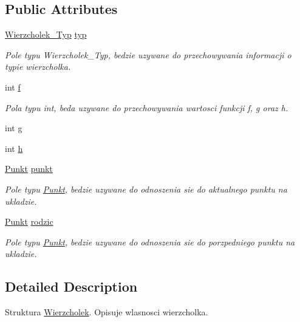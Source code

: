 \subsection*{Public Attributes}
\begin{DoxyCompactItemize}
\item 
\hyperlink{graf_8hh_af54d448689b4613c3715929ca2a914a2}{Wierzcholek\-\_\-\-Typ} \hyperlink{struct_wierzcholek_ac812fe482bda5f924cf38d48340aa018}{typ}
\begin{DoxyCompactList}\small\item\em Pole typu Wierzcholek\-\_\-\-Typ, bedzie uzywane do przechowywania informacji o typie wierzcholka. \end{DoxyCompactList}\item 
int \hyperlink{struct_wierzcholek_a013cad942d610c41b4cbea903ff8d9a5}{f}
\begin{DoxyCompactList}\small\item\em Pola typu int, beda uzywane do przechowywania wartosci funkcji f, g oraz h. \end{DoxyCompactList}\item 
int \hyperlink{struct_wierzcholek_a040d7401732673a65daf8cdbdaa7e2c1}{g}
\item 
int \hyperlink{struct_wierzcholek_ac7bb6b2e9a5254904bc67b33b76d34e4}{h}
\item 
\hyperlink{struct_punkt}{Punkt} \hyperlink{struct_wierzcholek_a1518a0baa5657789e074463d16728c52}{punkt}
\begin{DoxyCompactList}\small\item\em Pole typu \hyperlink{struct_punkt}{Punkt}, bedzie uzywane do odnoszenia sie do aktualnego punktu na ukladzie. \end{DoxyCompactList}\item 
\hyperlink{struct_punkt}{Punkt} \hyperlink{struct_wierzcholek_a57e48c2b959b2f2c9b416d13be59552d}{rodzic}
\begin{DoxyCompactList}\small\item\em Pole typu \hyperlink{struct_punkt}{Punkt}, bedzie uzywane do odnoszenia sie do porzpedniego punktu na ukladzie. \end{DoxyCompactList}\end{DoxyCompactItemize}


\subsection{Detailed Description}
Struktura \hyperlink{struct_wierzcholek}{Wierzcholek}. Opisuje wlasnosci wierzcholka. 

